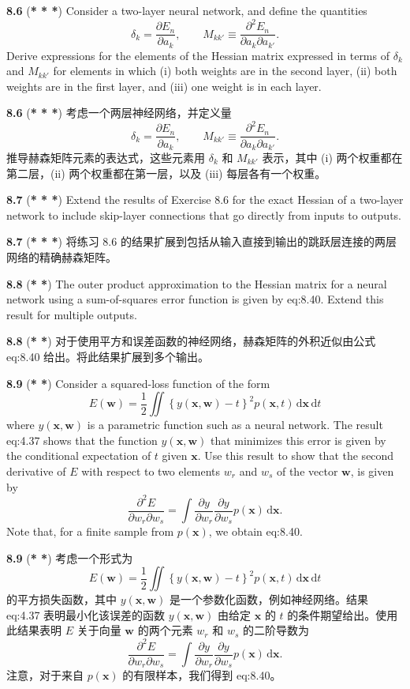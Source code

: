 \documentclass{article}
\begin{document}
\textbf{8.6} (\textbf{* * *}) Consider a two-layer neural network, and define the quantities
\[
\delta_k = \frac{\partial E_n}{\partial a_k}, \qquad M_{kk'} \equiv \frac{\partial^2 E_n}{\partial a_k \partial a_{k'}}.
\]
Derive expressions for the elements of the Hessian matrix expressed in terms of $\delta_k$ and $M_{kk'}$ for elements in which (i) both weights are in the second layer, (ii) both weights are in the first layer, and (iii) one weight is in each layer.

\textbf{8.6} (\textbf{* * *}) 考虑一个两层神经网络，并定义量
\[
\delta_k = \frac{\partial E_n}{\partial a_k}, \qquad M_{kk'} \equiv \frac{\partial^2 E_n}{\partial a_k \partial a_{k'}}.
\]
推导赫森矩阵元素的表达式，这些元素用 $\delta_k$ 和 $M_{kk'}$ 表示，其中 (i) 两个权重都在第二层，(ii) 两个权重都在第一层，以及 (iii) 每层各有一个权重。

\textbf{8.7} (\textbf{* * *}) Extend the results of Exercise 8.6 for the exact Hessian of a two-layer network to include skip-layer connections that go directly from inputs to outputs.

\textbf{8.7} (\textbf{* * *}) 将练习 8.6 的结果扩展到包括从输入直接到输出的跳跃层连接的两层网络的精确赫森矩阵。

\textbf{8.8} (\textbf{* *}) The outer product approximation to the Hessian matrix for a neural network using a sum-of-squares error function is given by {eq:8.40}. Extend this result for multiple outputs.

\textbf{8.8} (\textbf{* *}) 对于使用平方和误差函数的神经网络，赫森矩阵的外积近似由公式 {eq:8.40} 给出。将此结果扩展到多个输出。

\textbf{8.9} (\textbf{* *}) Consider a squared-loss function of the form
\[
E(\mathbf{w}) = \frac{1}{2} \iint \left\{ y(\mathbf{x}, \mathbf{w}) - t \right\}^2 p(\mathbf{x}, t) \, \mathrm{d}\mathbf{x} \, \mathrm{d}t
\]
where $y(\mathbf{x}, \mathbf{w})$ is a parametric function such as a neural network. The result {eq:4.37} shows that the function $y(\mathbf{x}, \mathbf{w})$ that minimizes this error is given by the conditional expectation of $t$ given $\mathbf{x}$. Use this result to show that the second derivative of $E$ with respect to two elements $w_r$ and $w_s$ of the vector $\mathbf{w}$, is given by
\[
\frac{\partial^2 E}{\partial w_r \partial w_s} = \int \frac{\partial y}{\partial w_r} \frac{\partial y}{\partial w_s} p(\mathbf{x}) \, \mathrm{d}\mathbf{x}.
\]
Note that, for a finite sample from $p(\mathbf{x})$, we obtain {eq:8.40}.

\textbf{8.9} (\textbf{* *}) 考虑一个形式为
\[
E(\mathbf{w}) = \frac{1}{2} \iint \left\{ y(\mathbf{x}, \mathbf{w}) - t \right\}^2 p(\mathbf{x}, t) \, \mathrm{d}\mathbf{x} \, \mathrm{d}t
\]
的平方损失函数，其中 $y(\mathbf{x}, \mathbf{w})$ 是一个参数化函数，例如神经网络。结果 {eq:4.37} 表明最小化该误差的函数 $y(\mathbf{x}, \mathbf{w})$ 由给定 $\mathbf{x}$ 的 $t$ 的条件期望给出。使用此结果表明 $E$ 关于向量 $\mathbf{w}$ 的两个元素 $w_r$ 和 $w_s$ 的二阶导数为
\[
\frac{\partial^2 E}{\partial w_r \partial w_s} = \int \frac{\partial y}{\partial w_r} \frac{\partial y}{\partial w_s} p(\mathbf{x}) \, \mathrm{d}\mathbf{x}.
\]
注意，对于来自 $p(\mathbf{x})$ 的有限样本，我们得到 {eq:8.40}。
\end{document}
